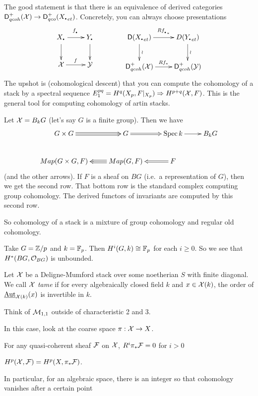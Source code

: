 The good statement is that there is an equivalence of derived
categories $\D^+_{qcoh}(\X)\to \D^+_{qco}(X_{\udot et})$. Concretely,
you can always choose presentations
\[\xymatrix{
  X_\udot \ar[r]^{f_\udot}\ar[d] & Y_\udot\ar[d]\\
  \X\ar[r]^f & \Y
}\qquad\qquad\xymatrix{
 \D(X_{\udot et})\ar[d]^\wr \ar[r]^{Rf_{\udot*}} & D(Y_{\udot
et})\ar[d]^\wr\\
\D^+_{qcoh}(\X)\ar[r]^{Rf_*} & \D^+_{qcoh}(\Y)
}\]
The upshot is (cohomological descent) that you can compute the
cohomology of a stack by a spectral sequence
$E^{pq}_1=H^q(X_p,F|_{X_p})\Rightarrow H^{p+q}(\mathcal{X},F)$. This is the
general tool for computing cohomology of artin stacks.
\begin{example}
  Let $\mathcal{X}=B_kG$ (let's say $G$ is a finite group). Then we have
  \[\xymatrix{
    G\times G \ar@3{->}[r] & G\ar@2{->}[r] & \spec k \ar[r] & B_kG\\
    Map(G\times G,F) & Map(G,F)\ar@3{->}[l] & F\ar@2{->}[l]
  }\]
  (and the other arrows). If $F$ is a sheaf on $BG$ (i.e.~a
representation of $G$), then we get the second row. That bottom row
is the standard complex computing group cohomology. The derived
functors of invariants are computed by this second row.
\end{example}
So cohomology of a stack is a mixture of group cohomology and regular
old cohomology.
\begin{example}
  Take $G=\mathbb{Z}/p$ and $k=\mathbb{F}_p$. Then $H^i(G,k)\cong \mathbb{F}_p$ for each
$i\ge 0$. So we see that $H^*(BG,\mathcal{O}_{BG})$ is unbounded.
\end{example}
\begin{definition}
  Let $\mathcal{X}$ be a Deligne-Mumford stack over some noetherian $S$ with
finite diagonal. We call $\mathcal{X}$ \emph{tame} if for every algebraically
closed field $k$ and $x\in \mathcal{X}(k)$, the order of $\operatorname{\underline{Aut}}_{\mathcal{X}(k)}(x)$ is
invertible in $k$.
\end{definition}
Think of $\mathcal{M}_{1,1}$ outside of characteristic 2 and 3.

In this case, look at the coarse space $\pi:\mathcal{X}\to X$.
\begin{proposition}
  For any quasi-coherent sheaf $\mathcal{F}$ on $\mathcal{X}$, $R^i\pi_*\mathcal{F}=0$ for $i>0$
\end{proposition}
\begin{corollary}
  $H^p(\mathcal{X},\mathcal{F})=H^p(X,\pi_*\mathcal{F})$.
\end{corollary}
In particular, for an algebraic space, there is an integer so that
cohomology vanishes after a certain point 

